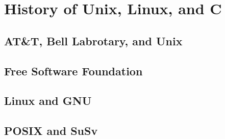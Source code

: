 \documentclass[main]{subfiles}
\begin{document}
\section{History of Unix, Linux, and C}
\subsection{AT\&T, Bell Labrotary, and Unix}
\subsection{Free Software Foundation}
\subsection{Linux and GNU}
\subsection{POSIX and SuSv}
\end{document}
